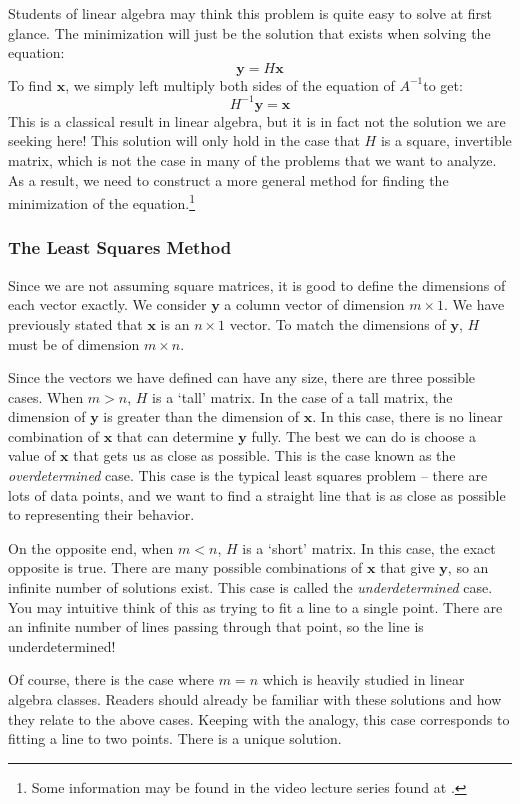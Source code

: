 Students of linear algebra may think this problem is quite easy to solve at first glance. The minimization will just be the solution that exists when solving the equation:
$$\bm{y}=H\bm{x}$$
To find $\bm{x}$, we simply left multiply both sides of the equation of $A^{-1}$to get:
$$H^{-1}\bm{y}=\bm{x}$$
This is a classical result in linear algebra, but it is in fact not the solution we are seeking here! This solution will only hold in the case that $H$ is a square, invertible matrix, which is not the case in many of the problems that we want to analyze. As a result, we need to construct a more general method for finding the minimization of the equation.\footnote{Some information may be found in the video lecture series found at \cite{brunton_singular_nodate}.}

\subsubsection{The Least Squares Method}
Since we are not assuming square matrices, it is good to define the dimensions of each vector exactly. We consider $\bm{y}$ a column vector of dimension $m\times1$. We have previously stated that $\bm{x}$ is an $n\times1$ vector. To match the dimensions of $\bm{y}$, $H$ must be of dimension $m\times n$.

Since the vectors we have defined can have any size, there are three possible cases. When $m>n$, $H$ is a `tall' matrix. In the case of a tall matrix, the dimension of $\bm{y}$ is greater than the dimension of $\bm{x}$. In this case, there is no linear combination of $\bm{x}$ that can determine $\bm{y}$ fully. The best we can do is choose a value of $\bm{x}$ that gets us as close as possible. This is the case known as the \textit{overdetermined} case. This case is the typical least squares problem -- there are lots of data points, and we want to find a straight line that is as close as possible to representing their behavior.

On the opposite end, when $m<n$, $H$ is a `short' matrix. In this case, the exact opposite is true. There are many possible combinations of $\bm{x}$ that give $\bm{y}$, so an infinite number of solutions exist. This case is called the \textit{underdetermined} case. You may intuitive think of this as trying to fit a line to a single point. There are an infinite number of lines passing through that point, so the line is underdetermined!

Of course, there is the case where $m=n$ which is heavily studied in linear algebra classes. Readers should already be familiar with these solutions and how they relate to the above cases. Keeping with the analogy, this case corresponds to fitting a line to two points. There is a unique solution.

